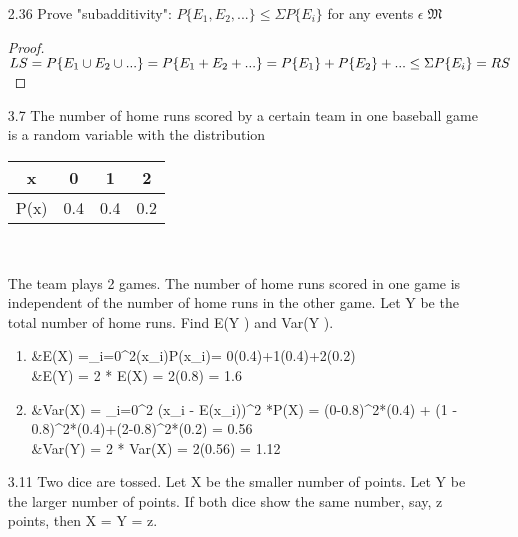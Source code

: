 \documentclass[fleqn]{article}
\begin{document}
\begin{enumerate}
\item [2.36]
Prove "subadditivity": $P\{E_{1}, E_{2}, ...\} \leq \Sigma P\{E_i\}  $ for any events $\epsilon\;\mathfrak{M}$

	\begin{proof}
	$   
	\\LS
	\\ =P\{E_1 \cup E_2 \cup ...\}
	\\ =P\{E_1 + E_2 + ...\}
	\\ = P\{E_1\}+P\{E_2\} + ...
	\\ \leq \Sigma P\{E_i\}
	\\ = RS
	$
	\qedhere
	\end{proof}

\item [3.7]
The number of home runs scored by a certain team in one baseball game is a random variable with the distribution

	\centering
	\begin{tabular}{|c|c|c|c|}
	\hline
	x    &0   &1    &2\\
	\hline
	P(x) &0.4 & 0.4 &0.2\\
	\hline
	\end{tabular}
	\\[3ex]		%
	\raggedright

The team plays 2 games. The number of home runs scored in one game is independent of
the number of home runs in the other game. Let Y be the total number of home runs. Find
E(Y ) and Var(Y ).

	\begin{enumerate}
		\item %
		\begin{flalign*}
		&E(X) =\sum\limits_{i=0}^2(x_i)P(x_i)= 0(0.4)+1(0.4)+2(0.2) \\
		&E(Y) = 2 * E(X) = 2(0.8) = 1.6
		\end{flalign*}
		
		\item %
		\begin{flalign*}
		&Var(X) = \sum\limits_{i=0}^2 (x_i - E(x_i))^2 *P(X) 
		= (0-0.8)^2*(0.4) + (1 - 0.8)^2*(0.4)+(2-0.8)^2*(0.2) = 0.56
		\\
		&Var(Y) = 2 * Var(X) = 2(0.56) = 1.12
		\end{flalign*}
	\end{enumerate}

\item[3.11]
Two dice are tossed. Let X be the smaller number of points. Let Y be the larger number
of points. If both dice show the same number, say, z points, then X = Y = z.
	

\end{enumerate}
\end{document}
